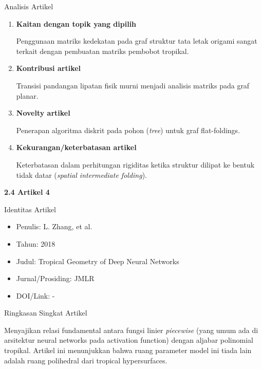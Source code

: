 \documentclass[12pt,a4paper]{article}
\begin{document}
\noindent Analisis Artikel
\begin{enumerate}
      \item \textbf{Kaitan dengan topik yang dipilih}\par
            Penggunaan matriks kedekatan pada graf struktur tata letak origami sangat terkait dengan pembuatan matriks pembobot tropikal.
      \item \textbf{Kontribusi artikel}\par
            Transisi pandangan lipatan fisik murni menjadi analisis matriks pada graf planar.
      \item \textbf{Novelty artikel}\par
            Penerapan algoritma diskrit pada pohon (\textit{tree}) untuk graf flat-foldings.
      \item \textbf{Kekurangan/keterbatasan artikel}\par
            Keterbatasan dalam perhitungan rigiditas ketika struktur dilipat ke bentuk tidak datar (\textit{spatial intermediate folding}).
\end{enumerate}

\newpage
\noindent\textbf{\large 2.4 Artikel 4 \cite{zhang2018tropical}}\par

\noindent Identitas Artikel
\begin{itemize}
      \item[-] Penulis: L. Zhang, et al.
      \item[-] Tahun: 2018
      \item[-] Judul: Tropical Geometry of Deep Neural Networks
      \item[-] Jurnal/Prosiding: JMLR
      \item[-] DOI/Link: -
\end{itemize}


\noindent Ringkasan Singkat Artikel\par
Menyajikan relasi fundamental antara fungsi linier \textit{piecewise} (yang umum ada di arsitektur neural networks pada activation function) dengan aljabar polinomial tropikal. Artikel ini menunjukkan bahwa ruang parameter model ini tiada lain adalah ruang polihedral dari tropical hypersurfaces.
\end{document}
